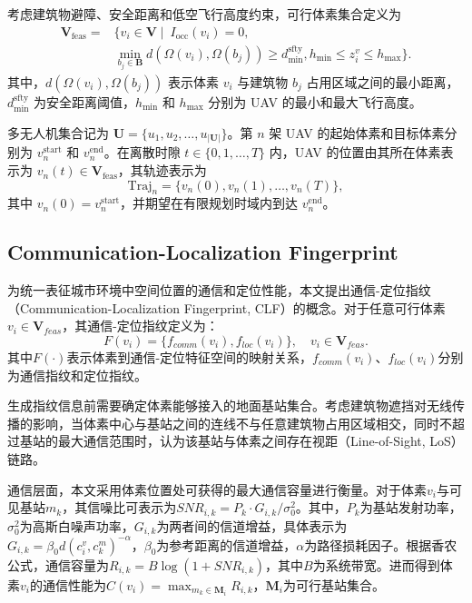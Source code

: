 \documentclass[lettersize,journal]{IEEEtran}
\begin{document}
考虑建筑物避障、安全距离和低空飞行高度约束，可行体素集合定义为
\begin{equation}
\begin{aligned}
\mathbf{V}_{\mathrm{feas}}=& \{v_i\in\mathbf{V}\mid\ 
I_{\mathrm{occ}}(v_i)=0,\\
&\min_{b_j\in\mathbf{B}}d(\Omega(v_i),\Omega(b_j))\ge d_{\min}^{\mathrm{sfty}},h_{\min}\le z_i^v\le h_{\max}\}.
\end{aligned}
\end{equation}
其中，$d(\Omega(v_i),\Omega(b_j))$ 表示体素 $v_i$ 与建筑物 $b_j$ 占用区域之间的最小距离，$d_{\min}^{\mathrm{sfty}}$ 为安全距离阈值，$h_{\min}$ 和 $h_{\max}$ 分别为 UAV 的最小和最大飞行高度。

多无人机集合记为
$\mathbf{U}=\{u_1,u_2,\ldots,u_{|\mathbf{U}|}\}$。第 $n$ 架 UAV 的起始体素和目标体素分别为
$v_n^{\mathrm{start}}$ 和 $v_n^{\mathrm{end}}$。在离散时隙 $t\in\{0,1,\ldots,T\}$ 内，UAV 的位置由其所在体素表示为 $v_n(t)\in\mathbf{V}_{\mathrm{feas}}$，其轨迹表示为
\begin{equation}
\mathrm{Traj}_n=\{v_n(0),v_n(1),\ldots,v_n(T)\},
\end{equation}
其中 $v_n(0)=v_n^{\mathrm{start}}$，并期望在有限规划时域内到达 $v_n^{\mathrm{end}}$。

\subsection{Communication-Localization Fingerprint}

为统一表征城市环境中空间位置的通信和定位性能，本文提出通信-定位指纹（Communication-Localization Fingerprint, CLF）的概念。对于任意可行体素$v_i\in\mathbf{V}_{feas}$，其通信-定位指纹定义为：
\begin{equation}
F(v_i)=\{f_{comm}(v_i),f_{loc}(v_i)\},\quad v_i\in\mathbf{V}_{feas}.
\end{equation}
其中$F(\cdot)$表示体素到通信-定位特征空间的映射关系，$f_{comm}(v_i)$、$f_{loc}(v_i)$分别为通信指纹和定位指纹。

生成指纹信息前需要确定体素能够接入的地面基站集合。考虑建筑物遮挡对无线传播的影响，当体素中心与基站之间的连线不与任意建筑物占用区域相交，同时不超过基站的最大通信范围时，认为该基站与体素之间存在视距（Line-of-Sight, LoS）链路。

通信层面，本文采用体素位置处可获得的最大通信容量进行衡量。对于体素$v_i$与可见基站$m_k$，其信噪比可表示为$SNR_{i,k}=P_k\cdot G_{i,k}/\sigma_0^2$。其中，$P_k$为基站发射功率，$\sigma_0^2$为高斯白噪声功率，$G_{i,k}$为两者间的信道增益，具体表示为$G_{i,k}=\beta_0d(c_i^v,c_k^m)^{-\alpha}$，$\beta_0$为参考距离的信道增益，$\alpha$为路径损耗因子。根据香农公式，通信容量为$R_{i,k}=B\log(1+SNR_{i,k})$，其中$B$为系统带宽。进而得到体素$v_i$的通信性能为$C(v_i)=\max_{m_k\in\mathbf{M}_i}R_{i,k}$，$\mathbf{M}_i$为可行基站集合。
\end{document}
